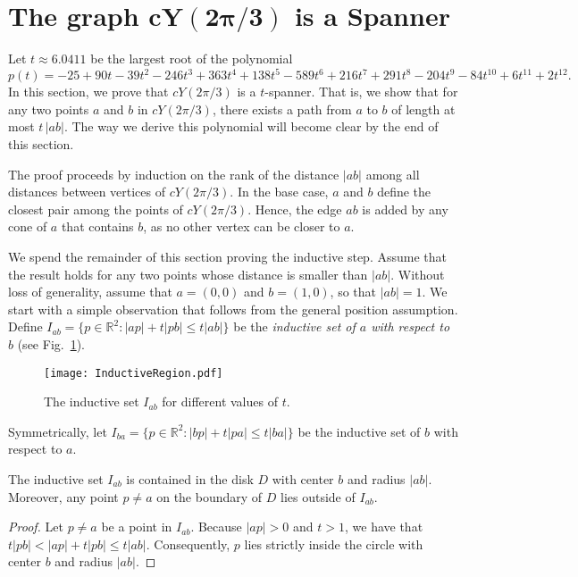 \documentclass{cccg14}
\newcommand{\cyaoOneTwenty}{\ensuremath{cY(2\pi/3)}\xspace}
\newcommand{\spanningRationCyao}{\ensuremath{6.0411}\xspace}
\begin{document}
\section{The graph $\boldsymbol{\cyaoOneTwenty}$ is a Spanner}\label{section:The 2pi/3 cyao}

Let $t\approx \spanningRationCyao$ be the largest root of the polynomial
$p(t) = -25 + 90 t - 39 t^2 - 246 t^3 + 363 t^4 + 138 t^5 - 589 t^6 + 
 216 t^7 + 291 t^8 - 204 t^9 - 84 t^{10} + 6 t^{11} + 2 t^{12}.$
In this section, we prove that \cyaoOneTwenty is a $t$-spanner.
That is, we show that for any two points $a$ and $b$ in \cyaoOneTwenty, there exists a path from $a$ to $b$ of length at most $t\,|ab|$. The way we derive this polynomial will become clear by the end of this section.

The proof proceeds by induction on the rank of the distance $|ab|$ among all distances between vertices of \cyaoOneTwenty.
In the base case,
$a$ and $b$ define the closest pair among the points of \cyaoOneTwenty.
Hence, the edge $ab$ is added by any cone of $a$ that contains $b$,
as no other vertex can be closer to $a$.

We spend the remainder of this section proving the inductive step.
Assume that the result holds for any two points whose distance is smaller than $|ab|$.
Without loss of generality,
assume that $a=(0,0)$ and $b=(1,0)$,
so that $|ab| = 1$.
We start with a simple observation that follows from the general position assumption.
Define $I_{ab} = \{p\in \mathbb{R}^2 : |ap| + t|pb| \leq t|ab|\}$ be the \emph{inductive set of $a$ with respect to $b$}
(see Fig.~\ref{fig:Inductive Region}).
\begin{figure}[t]
\centering
\texttt{[image: InductiveRegion.pdf]}
\caption{\small The inductive set $I_{ab}$ for different values of $t$.}
\label{fig:Inductive Region}
\end{figure}
Symmetrically,
let $I_{ba} = \{p\in \mathbb{R}^2 : |bp| + t|pa| \leq t|ba|\}$ be the inductive set of $b$ with respect to $a$.

\begin{lemma}\label{lemma:Contained in circle}
The inductive set $I_{ab}$ is contained in the disk $D$ with center $b$ and radius $|ab|$.
Moreover, any point $p\neq a$ on the boundary of $D$ lies outside of $I_{ab}$.
\end{lemma}
\vspace{-0.8em}
\begin{proof}
Let $p \neq a$ be a point in $I_{ab}$.
Because $|ap|>0$ and $t > 1$, we have that 
$t  |pb| < |ap| + t|pb| \leq t|ab|$.
Consequently,
$p$ lies strictly inside the circle with center $b$ and radius $|ab|$.
\end{proof}
\end{document}
